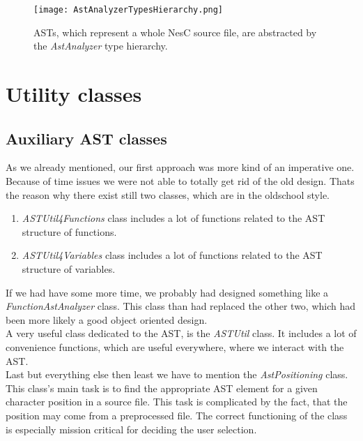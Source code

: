 \documentclass[a4paper,10pt]{report}
\begin{document}
\begin{figure}[h]
\centering
\texttt{[image: AstAnalyzerTypesHierarchy.png]}
\caption{ASTs, which represent a whole NesC source file, are abstracted by the {\it AstAnalyzer} type hierarchy.}
\label{AstAnalyzersTypeHierarchy}
\end{figure}

\section{Utility classes}

\subsection{Auxiliary AST classes}
As we already mentioned, our first approach was more kind of an imperative one. Because of time issues we were not able to totally get rid of the old design. Thats the reason why there exist still two classes, which are in the oldschool style.
   \begin{enumerate}
     \item {\it ASTUtil4Functions} class includes a lot of functions related to the AST structure of functions.
     \item {\it ASTUtil4Variables} class includes a lot of functions related to the AST structure of variables.
   \end{enumerate}
If we had have some more time, we probably had designed something like a {\it FunctionAstAnalyzer} class. This class than had replaced the other two, which had been more likely a good object oriented design.\\
A very useful class dedicated to the AST, is the {\it ASTUtil} class. It includes a lot of convenience functions, which are useful everywhere, where we interact with the AST.\\
Last but everything else then least we have to mention the {\it AstPositioning} class. This class's main task is to find the appropriate AST element for a given character position in a source file.
This task is complicated by the fact, that the position may come from a preprocessed file. The correct functioning of the class is especially mission critical for deciding the user selection.
\end{document}
